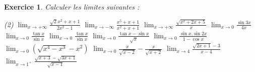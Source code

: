 \documentclass[12pt,a4paper]{article}
\newcommand{\Lim}{\displaystyle\lim}
\theoremstyle{mystyle}
\newtheorem{exo}{Exercice}
\begin{document}
\begin{multicols*}{2}
\begin{exo}
    Calculer les limites suivantes :
    \begin{tasks}(2)
        \task[$\bullet$] $\Lim_{x\to +\infty}\displaystyle\frac{\sqrt{2}x^2 + x+ 1}{2x^2-1}$
        \task[$\bullet$] $\Lim_{x\to -\infty}\displaystyle\frac{x^5 + x+ 1}{x^2+x+1}$
        \task[$\bullet$] $\Lim_{x\to +\infty}\displaystyle\frac{\sqrt{x^2 + 2x + 5}}{x}$
        \task[$\bullet$] $\Lim_{x\to 0}\displaystyle\frac{\sin{3x}}{4x}$
        \task[$\bullet$] $\Lim_{x\to 0}\displaystyle\frac{\tan{x}}{\sin{x}}$
        \task[$\bullet$] $\Lim_{x\to 0}\displaystyle\frac{\tan{x}}{\sin{x}}$
        \task[$\bullet$] $\Lim_{x\to 0}\displaystyle\frac{\tan{x}-\sin{x}}{\sqrt{x}}$
        \task[$\bullet$] $\Lim_{x\to 0}\displaystyle\frac{\sin{x}.\sin{2x}}{1-\cos{x}}$
        \task[$\bullet$] $\Lim_{x\to 0}(\sqrt{x^4-x^3} - x^2)$
        \task[$\bullet$] $\Lim_{x\to 0}\displaystyle\frac{x}{\sqrt{x-2}} - \displaystyle\frac{x}{\sqrt{x+2}}$
        \task[$\bullet$] $\Lim_{x\to 4}\displaystyle\frac{\sqrt{2x+1} - 3}{x-4}$
        \task[$\bullet$] $\Lim_{x\to 1^+}\displaystyle\frac{\sqrt{x+3} - \sqrt{3x+1}}{\sqrt{x-1}}$
        
        
        
        
    \end{tasks}
\end{exo}

\end{multicols*}
\end{document}
